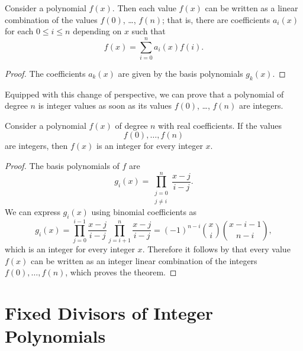 \begin{lemma}\label{lemma:is-linear-combination-values-polynomials}
  Consider a polynomial $f(x)$. Then each value $f(x)$ can be written as a linear combination of the values $f(0)$, \ldots, $f(n)$; that is, there are coefficients $a_i(x)$ for each $0\leq i\leq n$ depending on $x$ such that
  \begin{equation*}
    f(x) = \sum_{i=0}^na_i(x)f(i).
  \end{equation*}
\end{lemma}

\begin{proof}
  The coefficients $a_k(x)$ are given by the basis polynomials $g_k(x)$.
\end{proof}

Equipped with this change of perspective, we can prove that a polynomial of degree $n$ is integer values as soon as its values $f(0)$, \ldots, $f(n)$ are integers.

\begin{theorem}\label{theorem:integer-valued-polynomials}
  Consider a polynomial $f(x)$ of degree $n$ with real coefficients. If the values
  \begin{equation*}
    f(0),\ldots,f(n)
  \end{equation*}
  are integers, then $f(x)$ is an integer for every integer $x$.
\end{theorem}

\begin{proof}
  The basis polynomials of $f$ are
  \begin{equation*}
    g_i(x)=\prod_{\substack{j=0\\j\neq i}}^{n}\frac{x-j}{i-j}.
  \end{equation*}
  We can express $g_i(x)$ using binomial coefficients as
  \begin{equation*}
    g_i(x)=\prod_{j=0}^{i-1}\frac{x-j}{i-j}\prod_{j=i+1}^{n}\frac{x-j}{i-j}=(-1)^{n-i}\binom{x}{i}\binom{x-i-1}{n-i},
  \end{equation*}
  which is an integer for every integer $x$. Therefore it follows by  that every value $f(x)$ can be written as an integer linear combination of the integers $f(0),\ldots,f(n)$, which proves the theorem.
\end{proof}

\section{Fixed Divisors of Integer Polynomials}\label{section:fixed-divisors}

